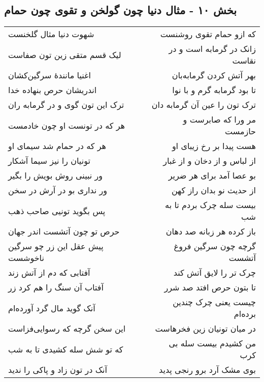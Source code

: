 \begin{center}
\section*{بخش ۱۰ - مثال دنیا چون گولخن و تقوی چون حمام}
\label{sec:sh010}
\begin{longtable}{l p{0.5cm} r}
شهوت دنیا مثال گلخنست
&&
که ازو حمام تقوی روشنست
\\
لیک قسم متقی زین تون صفاست
&&
زانک در گرمابه است و در نقاست
\\
اغنیا مانندهٔ سرگین‌کشان
&&
بهر آتش کردن گرمابه‌بان
\\
اندریشان حرص بنهاده خدا
&&
تا بود گرمابه گرم و با نوا
\\
ترک این تون گوی و در گرمابه ران
&&
ترک تون را عین آن گرمابه دان
\\
هر که در تونست او چون خادمست
&&
مر ورا که صابرست و حازمست
\\
هر که در حمام شد سیمای او
&&
هست پیدا بر رخ زیبای او
\\
تونیان را نیز سیما آشکار
&&
از لباس و از دخان و از غبار
\\
ور نبینی روش بویش را بگیر
&&
بو عصا آمد برای هر ضریر
\\
ور نداری بو در آرش در سخن
&&
از حدیث نو بدان راز کهن
\\
پس بگوید تونیی صاحب ذهب
&&
بیست سله چرک بردم تا به شب
\\
حرص تو چون آتشست اندر جهان
&&
باز کرده هر زبانه صد دهان
\\
پیش عقل این زر چو سرگین ناخوشست
&&
گرچه چون سرگین فروغ آتشست
\\
آفتابی که دم از آتش زند
&&
چرک تر را لایق آتش کند
\\
آفتاب آن سنگ را هم کرد زر
&&
تا بتون حرص افتد صد شرر
\\
آنک گوید مال گرد آورده‌ام
&&
چیست یعنی چرک چندین برده‌ام
\\
این سخن گرچه که رسوایی‌فزاست
&&
در میان تونیان زین فخرهاست
\\
که تو شش سله کشیدی تا به شب
&&
من کشیدم بیست سله بی کرب
\\
آنک در تون زاد و پاکی را ندید
&&
بوی مشک آرد برو رنجی پدید
\\
\end{longtable}
\end{center}

